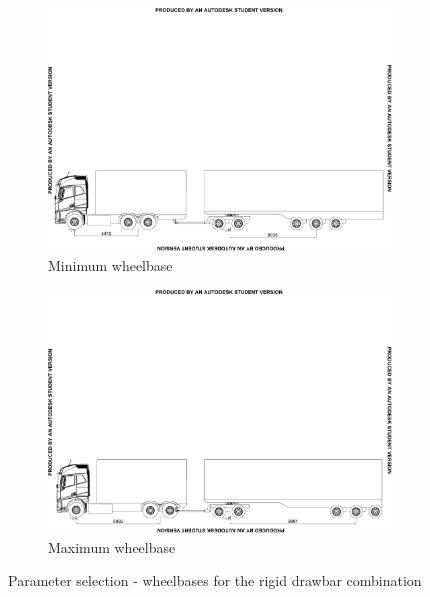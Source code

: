\begin{figure}[!htbp]
	\centering
	\begin{subfigure}[t]{1\textwidth}
		\centering
		\includegraphics[width=1\textwidth]{fig/parameter-selection_wheelbase_min_truck-and-dog}
		\caption{Minimum wheelbase}
	\end{subfigure}%

	\begin{subfigure}[t]{1\textwidth}
		\centering
		\includegraphics[width=1\textwidth]{fig/parameter-selection_wheelbase_max_truck-and-dog}
		\caption{Maximum wheelbase}
	\end{subfigure}

	\caption{Parameter selection - wheelbases for the rigid drawbar combination}
	\label{figure:parameter-selection-wheelbase-truck-and-dog}
\end{figure}


